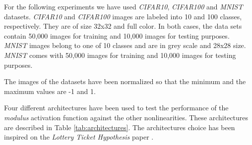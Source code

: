 For the following experiments we have used \textit{CIFAR10}, \textit{CIFAR100} \autocite{krizhevsky09} and \textit{MNIST} \autocite{lecun2010} datasets. \textit{CIFAR10} and \textit{CIFAR100} images are labeled into 10 and 100 classes, respectively. They are of size 32x32 and full color. In both cases, the data sets contain 50,000 images for training and 10,000 images for testing purposes. \textit{MNIST} images belong to one of 10 classes and are in grey scale and 28x28 size. \textit{MNIST} comes with 50,000 images for training and 10,000 images for testing purposes.

The images of the datasets have been normalized so that the minimum and the maximum values are -1 and 1. 

Four different architectures have been used to test the performance of the \textit{modulus} activation function against the other nonlinearities. These architectures are described in Table \ref{tab:architectures}. The architectures choice has been inspired on the \textit{Lottery Ticket Hypothesis} paper \autocite{frankleC19}.





